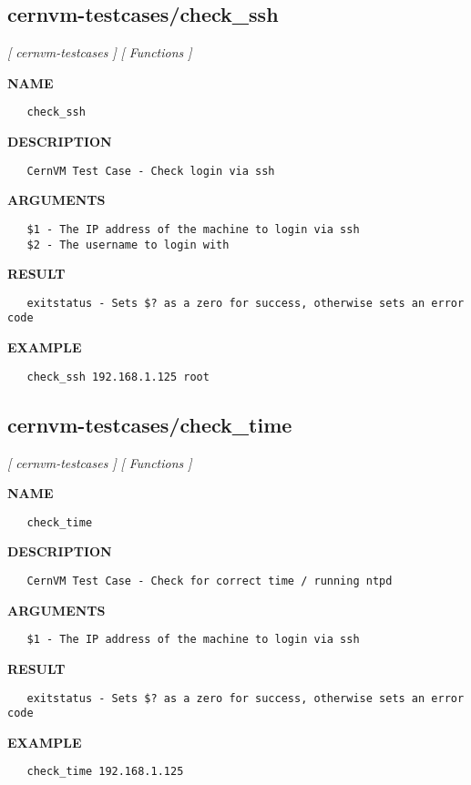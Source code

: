 \subsection{cernvm-testcases/check\_ssh}
\textsl{[ cernvm-testcases ]}
\textsl{[ Functions ]}

\label{ch:robo17}
\label{ch:cernvm_testcases_check_ssh}
\textbf{NAME}
\begin{verbatim}
   check_ssh
\end{verbatim}
\textbf{DESCRIPTION}
\begin{verbatim}
   CernVM Test Case - Check login via ssh
\end{verbatim}
\textbf{ARGUMENTS}
\begin{verbatim}
   $1 - The IP address of the machine to login via ssh
   $2 - The username to login with
\end{verbatim}
\textbf{RESULT}
\begin{verbatim}
   exitstatus - Sets $? as a zero for success, otherwise sets an error code
\end{verbatim}
\textbf{EXAMPLE}
\begin{verbatim}
   check_ssh 192.168.1.125 root
\end{verbatim}
\newpage
\subsection{cernvm-testcases/check\_time}
\textsl{[ cernvm-testcases ]}
\textsl{[ Functions ]}

\label{ch:robo18}
\label{ch:cernvm_testcases_check_time}
\textbf{NAME}
\begin{verbatim}
   check_time
\end{verbatim}
\textbf{DESCRIPTION}
\begin{verbatim}
   CernVM Test Case - Check for correct time / running ntpd
\end{verbatim}
\textbf{ARGUMENTS}
\begin{verbatim}
   $1 - The IP address of the machine to login via ssh
\end{verbatim}
\textbf{RESULT}
\begin{verbatim}
   exitstatus - Sets $? as a zero for success, otherwise sets an error code
\end{verbatim}
\textbf{EXAMPLE}
\begin{verbatim}
   check_time 192.168.1.125
\end{verbatim}
\newpage
